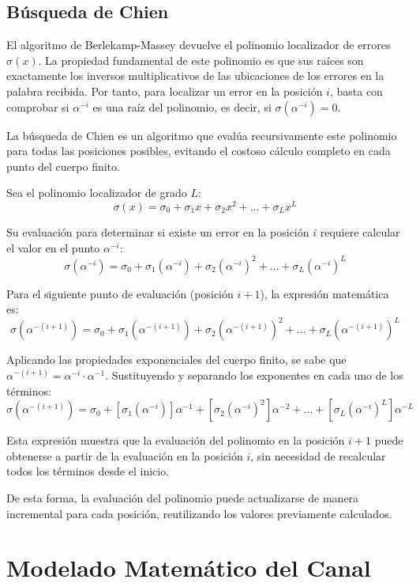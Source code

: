 \subsection{Búsqueda de Chien}

El algoritmo de Berlekamp-Massey devuelve el polinomio localizador de errores $\sigma(x)$. La propiedad fundamental de este polinomio es que sus raíces son exactamente los inversos multiplicativos de las ubicaciones de los errores en la palabra recibida. Por tanto, para localizar un error en la posición $i$, basta con comprobar si $\alpha^{-i}$ es una raíz del polinomio, es decir, si $\sigma(\alpha^{-i}) = 0$.

La búsqueda de Chien es un algoritmo que evalúa recursivamente este polinomio para todas las posiciones posibles, evitando el costoso cálculo completo en cada punto del cuerpo finito. 

Sea el polinomio localizador de grado $L$:
$$ \sigma(x) = \sigma_0 + \sigma_1 x + \sigma_2 x^2 + \dots + \sigma_L x^L $$

Su evaluación para determinar si existe un error en la posición $i$ requiere calcular el valor en el punto $\alpha^{-i}$:
$$ \sigma(\alpha^{-i}) = \sigma_0 + \sigma_1 (\alpha^{-i}) + \sigma_2 (\alpha^{-i})^2 + \dots + \sigma_L (\alpha^{-i})^L $$

Para el siguiente punto de evaluación (posición $i+1$), la expresión matemática es:
$$ \sigma(\alpha^{-(i+1)}) = \sigma_0 + \sigma_1 (\alpha^{-(i+1)}) + \sigma_2 (\alpha^{-(i+1)})^2 + \dots + \sigma_L (\alpha^{-(i+1)})^L $$

Aplicando las propiedades exponenciales del cuerpo finito, se sabe que $\alpha^{-(i+1)} = \alpha^{-i} \cdot \alpha^{-1}$. Sustituyendo y separando los exponentes en cada uno de los términos:
$$ \sigma(\alpha^{-(i+1)}) = \sigma_0 + \left[ \sigma_1 (\alpha^{-i}) \right] \alpha^{-1} + \left[ \sigma_2 (\alpha^{-i})^2 \right] \alpha^{-2} + \dots + \left[ \sigma_L (\alpha^{-i})^L \right] \alpha^{-L} $$

Esta expresión muestra que la evaluación del polinomio en la posición $i+1$ puede obtenerse a partir de la evaluación en la posición $i$, sin necesidad de recalcular todos los términos desde el inicio.

De esta forma, la evaluación del polinomio puede actualizarse de manera incremental para cada posición, reutilizando los valores previamente calculados.

\section{Modelado Matemático del Canal}
\label{sec:modelo_canal}

